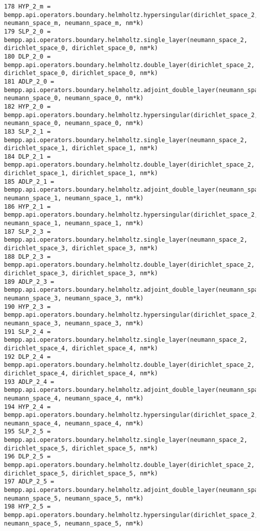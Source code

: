 \documentclass[12pt,letterpaper]{article}
\numberwithin{equation}{section}
\begin{document}
\begin{lstlisting}
178 HYP_2_m = bempp.api.operators.boundary.helmholtz.hypersingular(dirichlet_space_2, neumann_space_m, neumann_space_m, nm*k)
179 SLP_2_0 = bempp.api.operators.boundary.helmholtz.single_layer(neumann_space_2, dirichlet_space_0, dirichlet_space_0, nm*k)
180 DLP_2_0 = bempp.api.operators.boundary.helmholtz.double_layer(dirichlet_space_2, dirichlet_space_0, dirichlet_space_0, nm*k)
181 ADLP_2_0 = bempp.api.operators.boundary.helmholtz.adjoint_double_layer(neumann_space_2, neumann_space_0, neumann_space_0, nm*k)
182 HYP_2_0 = bempp.api.operators.boundary.helmholtz.hypersingular(dirichlet_space_2, neumann_space_0, neumann_space_0, nm*k)
183 SLP_2_1 = bempp.api.operators.boundary.helmholtz.single_layer(neumann_space_2, dirichlet_space_1, dirichlet_space_1, nm*k)
184 DLP_2_1 = bempp.api.operators.boundary.helmholtz.double_layer(dirichlet_space_2, dirichlet_space_1, dirichlet_space_1, nm*k)
185 ADLP_2_1 = bempp.api.operators.boundary.helmholtz.adjoint_double_layer(neumann_space_2, neumann_space_1, neumann_space_1, nm*k)
186 HYP_2_1 = bempp.api.operators.boundary.helmholtz.hypersingular(dirichlet_space_2, neumann_space_1, neumann_space_1, nm*k)
187 SLP_2_3 = bempp.api.operators.boundary.helmholtz.single_layer(neumann_space_2, dirichlet_space_3, dirichlet_space_3, nm*k)
188 DLP_2_3 = bempp.api.operators.boundary.helmholtz.double_layer(dirichlet_space_2, dirichlet_space_3, dirichlet_space_3, nm*k)
189 ADLP_2_3 = bempp.api.operators.boundary.helmholtz.adjoint_double_layer(neumann_space_2, neumann_space_3, neumann_space_3, nm*k)
190 HYP_2_3 = bempp.api.operators.boundary.helmholtz.hypersingular(dirichlet_space_2, neumann_space_3, neumann_space_3, nm*k)
191 SLP_2_4 = bempp.api.operators.boundary.helmholtz.single_layer(neumann_space_2, dirichlet_space_4, dirichlet_space_4, nm*k)
192 DLP_2_4 = bempp.api.operators.boundary.helmholtz.double_layer(dirichlet_space_2, dirichlet_space_4, dirichlet_space_4, nm*k)
193 ADLP_2_4 = bempp.api.operators.boundary.helmholtz.adjoint_double_layer(neumann_space_2, neumann_space_4, neumann_space_4, nm*k)
194 HYP_2_4 = bempp.api.operators.boundary.helmholtz.hypersingular(dirichlet_space_2, neumann_space_4, neumann_space_4, nm*k)
195 SLP_2_5 = bempp.api.operators.boundary.helmholtz.single_layer(neumann_space_2, dirichlet_space_5, dirichlet_space_5, nm*k)
196 DLP_2_5 = bempp.api.operators.boundary.helmholtz.double_layer(dirichlet_space_2, dirichlet_space_5, dirichlet_space_5, nm*k)
197 ADLP_2_5 = bempp.api.operators.boundary.helmholtz.adjoint_double_layer(neumann_space_2, neumann_space_5, neumann_space_5, nm*k)
198 HYP_2_5 = bempp.api.operators.boundary.helmholtz.hypersingular(dirichlet_space_2, neumann_space_5, neumann_space_5, nm*k)

\end{lstlisting}
\end{document}
